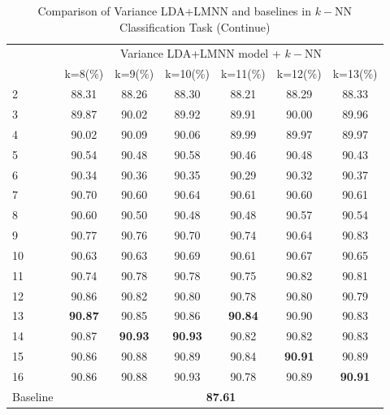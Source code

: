 \documentclass[conference]{IEEEtran}
\begin{document}
\begin{table}[htbp]
	\centering
 	\newcommand{\tabincell}[2]{\begin{tabular}{@{}#1@{}}#2\end{tabular}}
 	\renewcommand\arraystretch{1.0}
 	\caption{Comparison of Variance LDA+LMNN and baselines in $k-$NN Classification Task (Continue)}
 	\label{base8}%
 		\begin{tabular}{@{}p{1cm}<{\centering}|c|c|c|c|c|c}
 		\hline
 		\multirow{2}{*}{\diagbox[height=2\line,width=1.42cm,font=\tiny]{$k$}{Acc.}{$\mathit{M}$}} &
 		\multicolumn{6}{c}{Variance LDA+LMNN model + $k-$NN}\\
 		\cline{2-7}
		    & {k=8(\%)} & {k=9(\%)} & {k=10(\%)} & {k=11(\%)} & {k=12(\%)} & {k=13(\%)}\\
 		\hline
 		2   &88.31  &88.26  &88.30  &88.21  &88.29  &88.33  \\
 		3   &89.87  &90.02  &89.92  &89.91  &90.00  &89.96  \\
 		4   &90.02  &90.09  &90.06  &89.99  &89.97  &89.97  \\
 		5   &90.54  &90.48  &90.58  &90.46  &90.48  &90.43  \\
 		6   &90.34  &90.36  &90.35  &90.29  &90.32  &90.37  \\
 		7   &90.70  &90.60  &90.64  &90.61  &90.60  &90.61  \\
 		8   &90.60  &90.50  &90.48  &90.48  &90.57  &90.54  \\
 		9   &90.77  &90.76  &90.70  &90.74  &90.64  &90.83  \\
 		10   &90.63  &90.63  &90.69  &90.61  &90.67  &90.65  \\
 		11   &90.74  &90.78  &90.78  &90.75  &90.82  &90.81  \\
 		12   &90.86  &90.82  &90.80  &90.78  &90.80  &90.79  \\
 		13   & \textbf{90.87} &90.85  &90.86  & \textbf{90.84} &90.90  &90.83  \\
 		14   &90.87  & \textbf{90.93} & \textbf{90.93} &90.82  &90.82  &90.83  \\
 		15   &90.86  &90.88  &90.89  &90.84  & \textbf{90.91} &90.89  \\
		16   &90.86  &90.88  &90.93  &90.78  &90.89  & \textbf{90.91} \\  
		\hline
		Baseline & \multicolumn{6}{c}{\textbf{87.61}} \\
 		\hline
 	\end{tabular}
\end{table}
\end{document}
